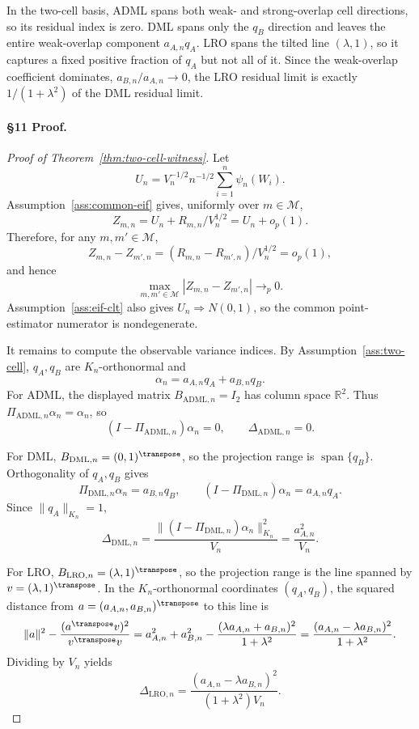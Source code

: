 In the two-cell basis, ADML spans both weak- and strong-overlap cell directions, so its residual index is zero.  DML spans only the \(q_B\) direction and leaves the entire weak-overlap component \(a_{A,n}q_A\).  LRO spans the tilted line \((\lambda,1)\), so it captures a fixed positive fraction of \(q_A\) but not all of it.  Since the weak-overlap coefficient dominates, \(a_{B,n}/a_{A,n}\to0\), the LRO residual limit is exactly \(1/(1+\lambda^2)\) of the DML residual limit.

\paragraph{\S11 Proof.}
\begin{proof}[Proof of Theorem~\ref{thm:two-cell-witness}]
Let
\[
  U_n=V_n^{-1/2}n^{-1/2}\sum_{i=1}^n\psi_n(W_i).
\]
Assumption~\ref{ass:common-eif} gives, uniformly over \(m\in\mathcal M\),
\[
  Z_{m,n}=U_n+R_{m,n}/V_n^{1/2}=U_n+o_p(1).
\]
Therefore, for any \(m,m'\in\mathcal M\),
\[
  Z_{m,n}-Z_{m',n}
  =(R_{m,n}-R_{m',n})/V_n^{1/2}
  =o_p(1),
\]
and hence
\[
  \max_{m,m'\in\mathcal M}|Z_{m,n}-Z_{m',n}|\to_p0.
\]
Assumption~\ref{ass:eif-clt} also gives \(U_n\Rightarrow N(0,1)\), so the common point-estimator numerator is nondegenerate.

It remains to compute the observable variance indices.  By Assumption~\ref{ass:two-cell}, \(q_A,q_B\) are \(K_n\)-orthonormal and
\[
  \alpha_n=a_{A,n}q_A+a_{B,n}q_B.
\]
For ADML, the displayed matrix \(B_{\mathrm{ADML},n}=I_2\) has column space \(\mathbb R^2\).  Thus \(\Pi_{\mathrm{ADML},n}\alpha_n=\alpha_n\), so
\[
  (I-\Pi_{\mathrm{ADML},n})\alpha_n=0,
  \qquad
  \Delta_{\mathrm{ADML},n}=0.
\]

For DML, \(B_{\mathrm{DML},n}=(0,1)^\transpose\), so the projection range is \(\operatorname{span}\{q_B\}\).  Orthogonality of \(q_A,q_B\) gives
\[
  \Pi_{\mathrm{DML},n}\alpha_n=a_{B,n}q_B,\qquad
  (I-\Pi_{\mathrm{DML},n})\alpha_n=a_{A,n}q_A.
\]
Since \(\|q_A\|_{K_n}=1\),
\[
  \Delta_{\mathrm{DML},n}
  =
  \frac{\|(I-\Pi_{\mathrm{DML},n})\alpha_n\|_{K_n}^2}{V_n}
  =
  \frac{a_{A,n}^2}{V_n}.
\]

For LRO, \(B_{\mathrm{LRO},n}=(\lambda,1)^\transpose\), so the projection range is the line spanned by \(v=(\lambda,1)^\transpose\).  In the \(K_n\)-orthonormal coordinates \((q_A,q_B)\), the squared distance from \(a=(a_{A,n},a_{B,n})^\transpose\) to this line is
\[
  \|a\|^2-\frac{(a^\transpose v)^2}{v^\transpose v}
  =
  a_{A,n}^2+a_{B,n}^2
  -
  \frac{(\lambda a_{A,n}+a_{B,n})^2}{1+\lambda^2}
  =
  \frac{(a_{A,n}-\lambda a_{B,n})^2}{1+\lambda^2}.
\]
Dividing by \(V_n\) yields
\[
  \Delta_{\mathrm{LRO},n}
  =
  \frac{(a_{A,n}-\lambda a_{B,n})^2}{(1+\lambda^2)V_n}.
\]


\end{proof}

